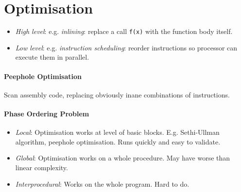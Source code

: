 \documentclass[twocolumn,english]{article}
\begin{document}
\section{Optimisation}
\begin{itemize}
\item \emph{High level}: e.g. \emph{inlining}: replace a call \texttt{f(x)}
with the function body itself.
\item \emph{Low level}: e.g. \emph{instruction scheduling}: reorder instructions
so processor can execute them in parallel.
\end{itemize}

\paragraph{Peephole Optimisation}

Scan assembly code, replacing obviously inane combinations of instructions.

\paragraph{Phase Ordering Problem}
\begin{itemize}
\item \emph{Local}: Optimisation works at level of basic blocks. E.g. Sethi-Ullman
algorithm, peephole optimisation. Runs quickly and easy to validate.
\item \emph{Global}: Optimisation works on a whole procedure. May have worse
than linear complexity.
\item \emph{Interprocedural}: Works on the whole program. Hard to do.
\end{itemize}
\end{document}
